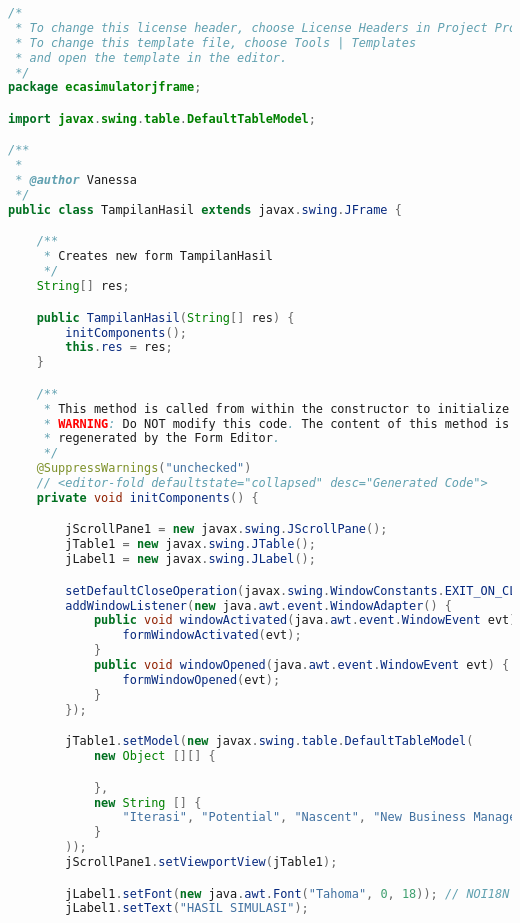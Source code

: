 \begin{lstlisting}[language=Java, caption=TampilanHasil.java]
/*
 * To change this license header, choose License Headers in Project Properties.
 * To change this template file, choose Tools | Templates
 * and open the template in the editor.
 */
package ecasimulatorjframe;

import javax.swing.table.DefaultTableModel;

/**
 *
 * @author Vanessa
 */
public class TampilanHasil extends javax.swing.JFrame {

    /**
     * Creates new form TampilanHasil
     */
    String[] res;

    public TampilanHasil(String[] res) {
        initComponents();
        this.res = res;
    }

    /**
     * This method is called from within the constructor to initialize the form.
     * WARNING: Do NOT modify this code. The content of this method is always
     * regenerated by the Form Editor.
     */
    @SuppressWarnings("unchecked")
    // <editor-fold defaultstate="collapsed" desc="Generated Code">                          
    private void initComponents() {

        jScrollPane1 = new javax.swing.JScrollPane();
        jTable1 = new javax.swing.JTable();
        jLabel1 = new javax.swing.JLabel();

        setDefaultCloseOperation(javax.swing.WindowConstants.EXIT_ON_CLOSE);
        addWindowListener(new java.awt.event.WindowAdapter() {
            public void windowActivated(java.awt.event.WindowEvent evt) {
                formWindowActivated(evt);
            }
            public void windowOpened(java.awt.event.WindowEvent evt) {
                formWindowOpened(evt);
            }
        });

        jTable1.setModel(new javax.swing.table.DefaultTableModel(
            new Object [][] {

            },
            new String [] {
                "Iterasi", "Potential", "Nascent", "New Business Manager", "Established", "Retired"
            }
        ));
        jScrollPane1.setViewportView(jTable1);

        jLabel1.setFont(new java.awt.Font("Tahoma", 0, 18)); // NOI18N
        jLabel1.setText("HASIL SIMULASI");


\end{lstlisting}
